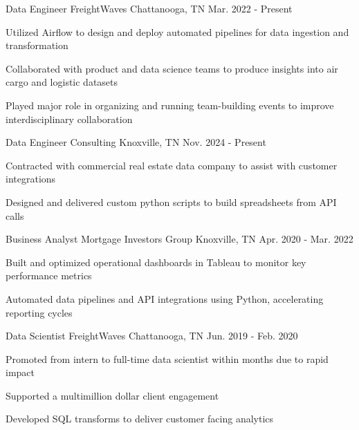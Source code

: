 
\begin{cventries}
  \cventry
    {Data Engineer} %
    {FreightWaves} %
    {Chattanooga, TN} %
    {Mar. 2022 - Present} %
    {
      \begin{cvitems} %
        \item {Utilized Airflow to design and deploy automated pipelines for data ingestion and transformation}
        \item {Collaborated with product and data science teams to produce insights into air cargo and logistic datasets}
        \item {Played major role in organizing and running team-building events to improve interdisciplinary collaboration}
      \end{cvitems}
    }
  
  \cventry
      {Data Engineer}
      {Consulting}
      {Knoxville, TN}
      {Nov. 2024 - Present}
      {
        \begin{cvitems}
          \item {Contracted with commercial real estate data company to assist with customer integrations }
          \item {Designed and delivered custom python scripts to build spreadsheets from API calls}
        \end{cvitems}
      }
      
  \cventry
    {Business Analyst} %
    {Mortgage Investors Group} %
    {Knoxville, TN} %
    {Apr. 2020 - Mar. 2022} %
    {
      \begin{cvitems} %
        \item Built and optimized operational dashboards in Tableau to monitor key performance metrics
        \item Automated data pipelines and API integrations using Python, accelerating reporting cycles
      \end{cvitems}
    }
    
  \cventry
    {Data Scientist} %
    {FreightWaves} %
    {Chattanooga, TN} %
    {Jun. 2019 - Feb. 2020} %
    {
      \begin{cvitems} %
        \item {Promoted from intern to full-time data scientist within months due to rapid impact}
        \item {Supported a multimillion dollar client engagement}
        \item {Developed SQL transforms to deliver customer facing analytics}
      \end{cvitems}
    }

\end{cventries}

